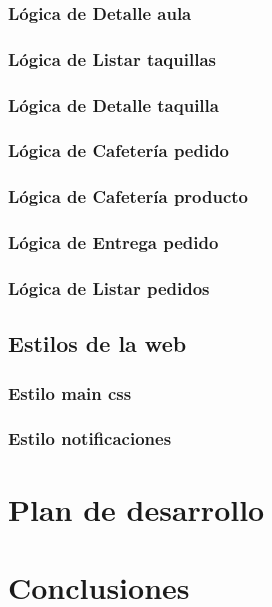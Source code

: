 \documentclass[12pt]{report}
\begin{document}
\subsection{Lógica de Detalle aula}
\subsection{Lógica de Listar taquillas}
\subsection{Lógica de Detalle taquilla}
\subsection{Lógica de Cafetería pedido}
\subsection{Lógica de Cafetería producto}
\subsection{Lógica de Entrega pedido}
\subsection{Lógica de Listar pedidos}



\section{Estilos de la web}
\subsection{Estilo main css}
\subsection{Estilo notificaciones}
\newpage
\chapter{Plan de desarrollo}

\newpage
\chapter{Conclusiones}

\newpage
\end{document}
